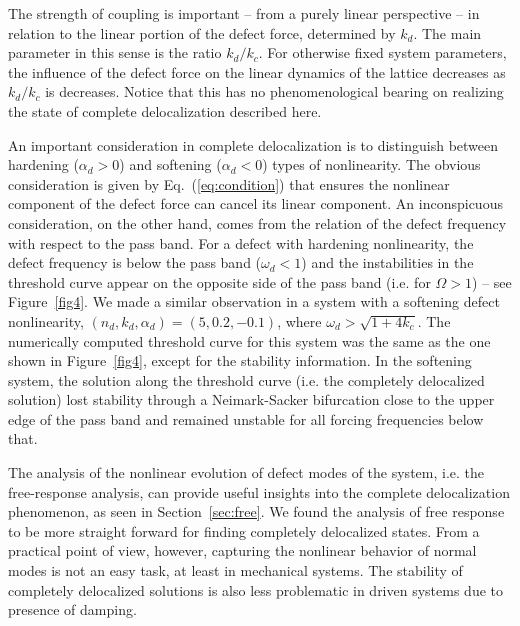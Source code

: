 \documentclass[aps,pre,twocolumn,groupedaddress]{revtex4-1}
\begin{document}
The strength of coupling is important -- from a purely linear perspective -- in relation to the linear portion of the defect force, determined by $k_d$. The main parameter in this sense is the ratio $k_d/k_c$. For otherwise fixed system parameters, the influence of the defect force on the linear dynamics of the lattice decreases as $k_d/k_c$ is decreases. Notice that this has no phenomenological bearing on realizing the state of complete delocalization described here.  


An important consideration in complete delocalization is to distinguish between hardening ($\alpha_d>0$) and softening ($\alpha_d<0$) types of nonlinearity. The obvious consideration is given by Eq.~(\ref{eq:condition}) that ensures the nonlinear component of the defect force can cancel its linear component. %
An inconspicuous consideration, on the other hand, comes from the relation of the defect frequency with respect to the pass band. For a defect with hardening nonlinearity, the defect frequency is below the pass band ($\omega_d<1$) and the instabilities in the threshold curve appear on the opposite side of the pass band (i.e. for $\Omega>1$) -- see Figure~\ref{fig4}. We made a similar observation in a system with a softening defect nonlinearity, $(n_d,k_d,\alpha_d)=(5,0.2,-0.1)$, where $\omega_d>\sqrt{1+4k_c}$. The numerically computed threshold curve for this system was the same as the one shown in Figure~\ref{fig4}, except for the stability information. In the softening system, the solution along the threshold curve (i.e. the completely delocalized solution) lost stability through a Neimark-Sacker bifurcation close to the upper edge of the pass band and remained unstable for all forcing frequencies below that. 


The analysis of the nonlinear evolution of defect modes of the system, i.e. the free-response analysis, can provide useful insights into the complete delocalization phenomenon, as seen in Section~\ref{sec:free}. We found the analysis of free response to be more straight forward for finding completely delocalized states. From a practical point of view, however, capturing the nonlinear behavior of normal modes is not an easy task, at least in mechanical systems. The stability of completely delocalized solutions is also less problematic in driven systems due to presence of damping. 
\end{document}
